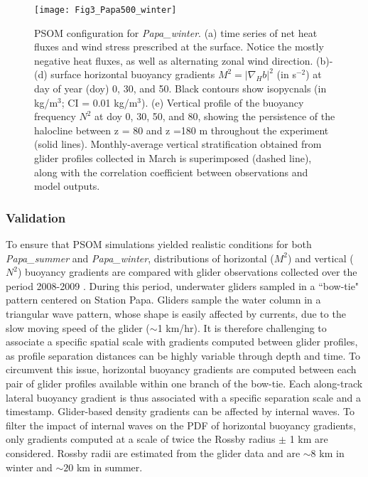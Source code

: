 \documentclass[article,linenumbers]{agujournal2018}
\begin{document}
	\begin{figure}[ht]
		\texttt{[image: Fig3\_Papa500\_winter]}
		\caption{PSOM configuration for \textit{Papa\_winter}. (a) time series of net heat fluxes and wind stress prescribed at the surface. Notice the mostly negative heat fluxes, as well as alternating zonal wind direction. (b)-(d) surface horizontal buoyancy gradients $M^2 = |\nabla_Hb|^2$ (in s$^{-2}$) at day of year (doy) 0, 30, and 50. Black contours show isopycnals (in kg/m$^3$; CI = 0.01 kg/m$^3$). (e) Vertical profile of the buoyancy frequency $N^2$ at doy 0, 30, 50, and 80, showing the persistence of the halocline between z = 80 and z =180 m throughout the experiment (solid lines). Monthly-average vertical stratification obtained from glider profiles collected in March is superimposed (dashed line), along with the correlation coefficient between observations and model outputs.}
		\label{fig: Papa_winter}
	\end{figure}
	
	
	\subsubsection{Validation}
	\label{sec: glider_validation}
	
	To ensure that PSOM simulations yielded realistic conditions for both \textit{Papa\_summer} and \textit{Papa\_winter}, distributions of horizontal ($M^2$) and vertical ($N^2$) buoyancy gradients are compared with glider observations collected over the period 2008-2009 \citep{Pelland_2016}.
	During this period, underwater gliders sampled in a ``bow-tie" pattern centered on Station Papa. Gliders sample the water column in a triangular wave pattern, whose shape is easily affected by currents, due to the slow moving speed of the glider ($\sim$1 km/hr). It is therefore challenging to associate a specific spatial scale with gradients computed between glider profiles, as profile separation distances can be highly variable through depth and time. To circumvent this issue, horizontal buoyancy gradients are computed between each pair of glider profiles available within one branch of the bow-tie. Each along-track lateral buoyancy gradient is thus associated with a specific separation scale and a timestamp. Glider-based density gradients can be affected by internal waves. To filter the impact of internal waves on the PDF of horizontal buoyancy gradients, only gradients computed at a scale of twice the Rossby radius $\pm$ 1 km are considered. Rossby radii are estimated from the glider data and are $\sim8$ km in winter and $\sim20$ km in summer.
	
\end{document}
